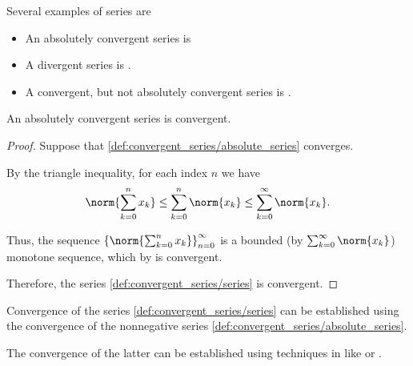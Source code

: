 \begin{example}\label{ex:series}
  Several examples of series are
  \begin{itemize}
    \item An absolutely convergent series is 
    \item A divergent series is .
    \item A convergent, but not absolutely convergent series is .
  \end{itemize}
\end{example}

\begin{proposition}\label{thm:absolutely_convergent_series_is_convergent}
  An absolutely convergent series is convergent.
\end{proposition}
\begin{proof}
  Suppose that \eqref{def:convergent_series/absolute_series} converges.

  By the triangle inequality, for each index \( n \) we have
  \begin{equation*}
    \norm{\sum_{k=0}^n x_k} \leq \sum_{k=0}^n \norm{x_k} \leq \sum_{k=0}^\infty \norm{x_k}.
  \end{equation*}

  Thus, the sequence \( \left\{ \norm{\sum_{k=0}^{n} x_k} \right\}_{n=0}^\infty \) is a bounded (by \( \sum_{k=0}^\infty \norm{x_k} \)) monotone sequence, which by  is convergent.

  Therefore, the series \eqref{def:convergent_series/series} is convergent.
\end{proof}

\begin{remark}\label{rem:establish_series_convergence_by_absolute_series}
  Convergence of the series \eqref{def:convergent_series/series} can be established using the convergence of the nonnegative series \eqref{def:convergent_series/absolute_series}.

  The convergence of the latter can be established using techniques in  like  or .
\end{remark}

